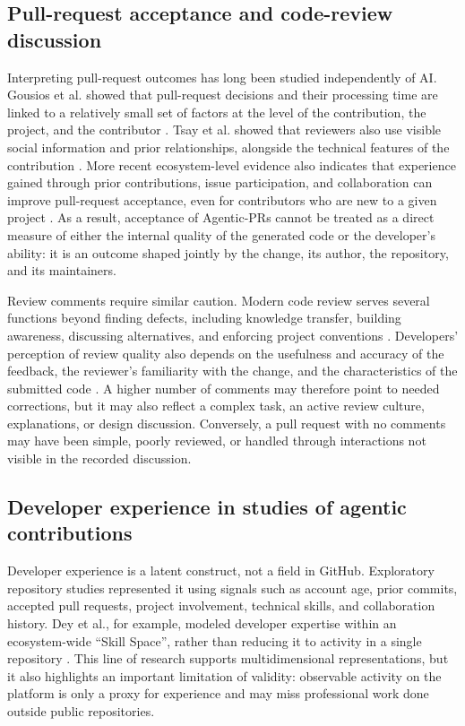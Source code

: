 \subsection{Pull-request acceptance and code-review discussion}
Interpreting pull-request outcomes has long been studied independently of AI. Gousios et al. showed that pull-request decisions and their processing time are linked to a relatively small set of factors at the level of the contribution, the project, and the contributor \cite{gousios2014pull}. Tsay et al. showed that reviewers also use visible social information and prior relationships, alongside the technical features of the contribution \cite{tsay2014influence}. More recent ecosystem-level evidence also indicates that experience gained through prior contributions, issue participation, and collaboration can improve pull-request acceptance, even for contributors who are new to a given project \cite{meijer2025ecosystem}. As a result, acceptance of Agentic-PRs cannot be treated as a direct measure of either the internal quality of the generated code or the developer's ability: it is an outcome shaped jointly by the change, its author, the repository, and its maintainers.

Review comments require similar caution. Modern code review serves several functions beyond finding defects, including knowledge transfer, building awareness, discussing alternatives, and enforcing project conventions \cite{bacchelli2013expectations}. Developers' perception of review quality also depends on the usefulness and accuracy of the feedback, the reviewer's familiarity with the change, and the characteristics of the submitted code \cite{kononenko2016quality}. A higher number of comments may therefore point to needed corrections, but it may also reflect a complex task, an active review culture, explanations, or design discussion. Conversely, a pull request with no comments may have been simple, poorly reviewed, or handled through interactions not visible in the recorded discussion.

\subsection{Developer experience in studies of agentic contributions}

Developer experience is a latent construct, not a field in GitHub. Exploratory repository studies represented it using signals such as account age, prior commits, accepted pull requests, project involvement, technical skills, and collaboration history. Dey et al., for example, modeled developer expertise within an ecosystem-wide ``Skill Space'', rather than reducing it to activity in a single repository \cite{dey2021expertise}. This line of research supports multidimensional representations, but it also highlights an important limitation of validity: observable activity on the platform is only a proxy for experience and may miss professional work done outside public repositories.


